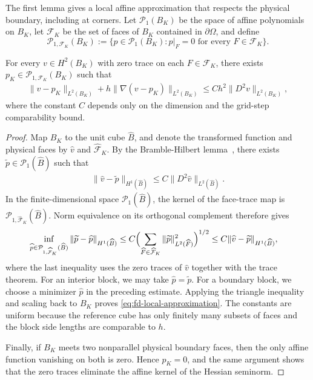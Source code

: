 \documentclass[print,wide,eng]{draft}
\begin{document}
The first lemma gives a local affine approximation that respects the physical boundary, including at corners. Let $\mathcal P_1(B_K)$ be the space of affine polynomials on $B_K$, let $\mathcal F_K$ be the set of faces of $B_K$ contained in $\partial\Omega$, and define\vspace{-2mm}
%
$$
\mathcal P_{1,\mathcal F_K}(B_K)
:=\{p\in\mathcal P_1(B_K):p|_F=0\text{ for every }F\in\mathcal F_K\}.
$$
%
\begin{lemma}\label{lem:fd-boundary-affine}
For every $v\in H^2(B_K)$ with zero trace on each $F\in\mathcal F_K$, there exists $p_K\in\mathcal P_{1,\mathcal F_K}(B_K)$ such that\vspace{-2mm}
%
\begin{align}\label{eq:fd-local-approximation}
\|v-p_K\|_{L^2(B_K)}+h\|\nabla(v-p_K)\|_{L^2(B_K)}
\leq Ch^2\|D^2v\|_{L^2(B_K)},
\end{align}
%
where the constant $C$ depends only on the dimension and the grid-step comparability bound.
\end{lemma}
%
%
\begin{proof}
Map $B_K$ to the unit cube $\widehat B$, and denote the transformed function and physical faces by $\widehat v$ and $\widehat{\mathcal F}_K$. By the Bramble-Hilbert lemma~\cite[Lemma~4.3.8]{Brenner2008}, there exists $\widetilde p\in\mathcal P_1(\widehat B)$ such that\vspace{-2mm}
%
\begin{align*}
\|\widehat v-\widetilde p\|_{H^1(\widehat B)}
\le C\|D^2\widehat v\|_{L^2(\widehat B)}.
\end{align*}
%
In the finite-dimensional space $\mathcal P_1(\widehat B)$, the kernel of the face-trace map is $\mathcal P_{1,\widehat{\mathcal F}_K}(\widehat B)$. Norm equivalence on its orthogonal complement therefore gives\vspace{-2mm}
%
\begin{align*}
\inf_{\widehat p\in\mathcal P_{1,\widehat{\mathcal F}_K}(\widehat B)}
\|\widetilde p-\widehat p\|_{H^1(\widehat B)}
&\le C\Bigl(\sum_{\widehat F\in\widehat{\mathcal F}_K}
\|\widetilde p\|_{L^2(\widehat F)}^2\Bigr)^{1/2}
\le C\|\widehat v-\widetilde p\|_{H^1(\widehat B)},
\end{align*}
%
where the last inequality uses the zero traces of $\widehat v$ together with the trace theorem. For an interior block, we may take $\widehat p=\widetilde p$. For a boundary block, we choose a minimizer $\widehat p$ in the preceding estimate. Applying the triangle inequality and scaling back to $B_K$ proves \cref{eq:fd-local-approximation}. The constants are uniform because the reference cube has only finitely many subsets of faces and the block side lengths are comparable to $h$.

Finally, if $B_K$ meets two nonparallel physical boundary faces, then the only affine function vanishing on both is zero. Hence $p_K=0$, and the same argument shows that the zero traces eliminate the affine kernel of the Hessian seminorm.
\end{proof}
%
\end{document}
